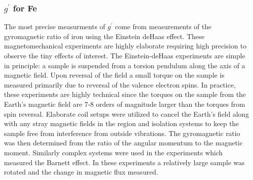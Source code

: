 \documentclass[12pt]{article}
\begin{document}
\subsubsection{$g^{\prime}$ for Fe}
The most precise measurments of $g^{\prime}$ come from measurements of the gyromagnetic ratio of iron using the Einstein deHaas effect. These magnetomechanical experiments are highly elaborate requiring high precision to observe the tiny effects of interest. The Einstein-deHaas experiments are simple in principle: a sample is suspended from a torsion pendulum along the axis of a magnetic field. Upon reversal of the field a small torque on the sample is measured primarily due to reversal of the valence electron spins. In practice, these experiments are highly technical since the torques on the sample from the Earth's magnetic field are 7-8 orders of magnitude larger than the torques from spin reversal. Elaborate coil setups were utilized to cancel the Earth's field along with any stray magnetic fields in the region and isolation systems to keep the sample free from interference from outside vibrations. The gyromagnetic ratio was then determined from the ratio of the angular momentum to the magnetic moment. Similarly complex systems were used in the experiments which measured the Barnett effect. In these experiments a relatively large sample was rotated and the change in magnetic flux measured. 
\end{document}
